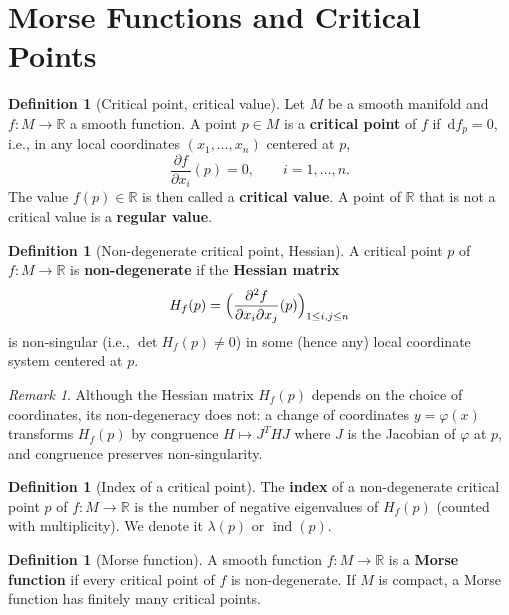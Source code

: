 \documentclass[12pt,a4paper,openany]{book}
\theoremstyle{definition}
\newtheorem{definition}[theorem]{Definition}
\theoremstyle{remark}
\newtheorem{remark}[theorem]{Remark}
\newcommand{\R}{\mathbb{R}}
\newcommand{\dd}{\,\mathrm{d}}
\begin{document}
\section{Morse Functions and Critical Points}\label{sec:morse-functions}

\begin{definition}[Critical point, critical value]\label{def:critical-point-morse}
Let $M$ be a smooth manifold and $f\colon M \to \R$ a smooth function.
A point $p \in M$ is a \textbf{critical point} of $f$ if
$\dd f_p = 0$, i.e., in any local coordinates $(x_1,\dots,x_n)$
centered at $p$,
\[
  \frac{\partial f}{\partial x_i}(p) = 0, \qquad i = 1,\dots,n.
\]
The value $f(p) \in \R$ is then called a \textbf{critical value}.
A point of $\R$ that is not a critical value is a \textbf{regular value}.
\end{definition}

\begin{definition}[Non-degenerate critical point, Hessian]\label{def:nondegenerate}
A critical point $p$ of $f\colon M \to \R$ is \textbf{non-degenerate}
if the \textbf{Hessian matrix}
\[
  H_f(p) = \Bigl(\frac{\partial^2 f}{\partial x_i \partial x_j}(p)\Bigr)_{1 \le i,j \le n}
\]
is non-singular (i.e., $\det H_f(p) \neq 0$) in some (hence any)
local coordinate system centered at $p$.
\end{definition}

\begin{remark}\label{rem:hessian-well-defined}
Although the Hessian matrix $H_f(p)$ depends on the choice of coordinates,
its non-degeneracy does not: a change of coordinates
$y = \varphi(x)$ transforms $H_f(p)$ by congruence
$H \mapsto J^T H J$ where $J$ is the Jacobian of $\varphi$ at $p$,
and congruence preserves non-singularity.
\end{remark}

\begin{definition}[Index of a critical point]\label{def:morse-index}
The \textbf{index} of a non-degenerate critical point $p$ of
$f\colon M \to \R$ is the number of negative eigenvalues of $H_f(p)$
(counted with multiplicity). We denote it $\lambda(p)$ or $\operatorname{ind}(p)$.
\end{definition}

\begin{definition}[Morse function]\label{def:morse-function}
A smooth function $f\colon M \to \R$ is a \textbf{Morse function}
if every critical point of $f$ is non-degenerate.
If $M$ is compact, a Morse function has finitely many critical points.
\end{definition}
\end{document}
